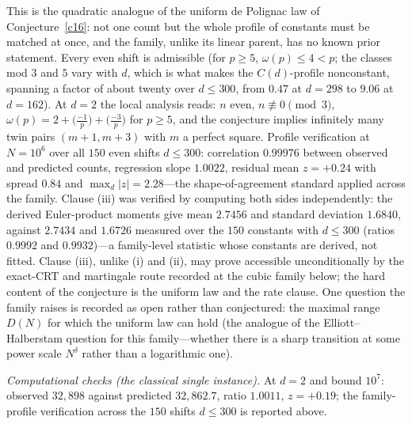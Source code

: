 \documentclass[11pt]{article}
\theoremstyle{definition}
\begin{document}
This is the quadratic analogue of the uniform de Polignac law of
Conjecture~\ref{c16}: not one count but the whole profile of constants
must be matched at once, and the family, unlike its linear parent, has
no known prior statement.  Every even shift is admissible (for
$p\ge5$, $\omega(p)\le4<p$; the classes mod $3$ and $5$ vary with $d$,
which is what makes the $C(d)$-profile nonconstant, spanning a factor of about twenty over $d\le300$, from $0.47$ at $d=298$ to $9.06$ at $d=162$).  At $d=2$ the local analysis reads:
$n$ even, $n\not\equiv0\pmod3$,
$\omega(p)=2+\bigl(\frac{-1}{p}\bigr)+\bigl(\frac{-3}{p}\bigr)$ for
$p\ge5$, and the conjecture implies infinitely many twin pairs
$(m+1,m+3)$ with $m$ a perfect square.  Profile verification at
$N=10^6$ over all $150$ even shifts $d\le300$: correlation
$0.99976$ between observed and predicted counts, regression slope
$1.0022$, residual mean $z=+0.24$ with spread $0.84$ and
$\max_d|z|=2.28$---the shape-of-agreement standard applied across the
family.  Clause (iii) was verified by
computing both sides independently: the derived Euler-product moments
give mean $2.7456$ and standard deviation $1.6840$, against
$2.7434$ and $1.6726$ measured over the $150$ constants with
$d\le300$ (ratios $0.9992$ and $0.9932$)---a family-level statistic whose constants are derived, not fitted.  Clause (iii), unlike (i) and (ii), may prove accessible unconditionally by the exact-CRT and martingale route recorded at the cubic family below; the hard content of the conjecture is the uniform law and the rate clause.  One question the family raises is
recorded as
open rather than conjectured: the maximal range $D(N)$ for which the
uniform law can hold (the analogue of the Elliott--Halberstam
question for this family---whether there is a sharp transition at
some power scale $N^{\delta}$ rather than a logarithmic one).

\emph{Computational checks (the classical single instance).}  At $d=2$ and
bound $10^{7}$: observed $32{,}898$ against predicted $32{,}862.7$,
ratio $1.0011$, $z=+0.19$; the family-profile verification across the
$150$ shifts $d\le300$ is reported above.
\end{document}
